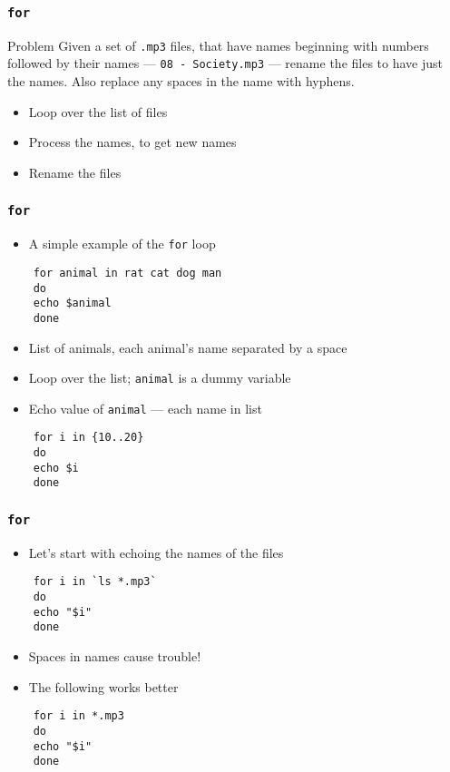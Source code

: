 \documentclass[12pt,compress]{beamer}
\begin{document}
\begin{frame}[fragile]
  \frametitle{\texttt{for}}
  \begin{block}{Problem}
    Given a set of \texttt{.mp3} files, that have names beginning with
    numbers followed by their names --- \texttt{08 - Society.mp3} ---
    rename the files to have just the names. Also replace any spaces
    in the name with hyphens. 
  \end{block}
  \begin{itemize}
  \item Loop over the list of files
  \item Process the names, to get new names
  \item Rename the files
  \end{itemize}
\end{frame}

\begin{frame}[fragile]
  \frametitle{\texttt{for}} 
  \begin{itemize}
  \item A simple example of the \texttt{for} loop
  \end{itemize}
  \begin{lstlisting}
    for animal in rat cat dog man
    do 
    echo $animal
    done
  \end{lstlisting} %
  \begin{itemize}
  \item List of animals, each animal's name separated by a space
  \item Loop over the list; \texttt{animal} is a dummy variable
  \item Echo value of \texttt{animal} ---  each name in list
  \end{itemize}
  \begin{lstlisting}
    for i in {10..20}
    do 
    echo $i
    done
  \end{lstlisting} %
\end{frame}

\begin{frame}[fragile]
  \frametitle{\texttt{for}}
  \begin{itemize}
  \item Let's start with echoing the names of the files
  \end{itemize}
  \begin{lstlisting}
    for i in `ls *.mp3`
    do
    echo "$i"
    done
  \end{lstlisting} %
  \begin{itemize}
  \item Spaces in names cause trouble!
  \item The following works better
  \end{itemize}
  \begin{lstlisting}
    for i in *.mp3
    do
    echo "$i"
    done
  \end{lstlisting} %
\end{frame}
\end{document}
